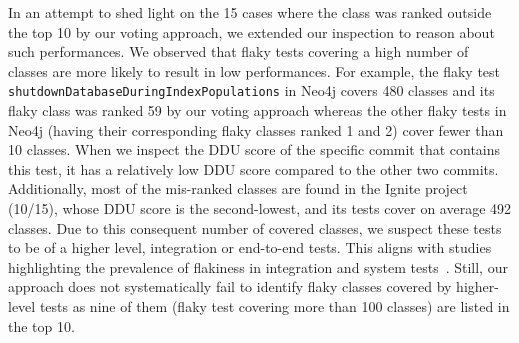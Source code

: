 \begin{table*}[ht]
\caption{DDU metrics for the analysed test suites. \label{tab:DDU}}
\centering
{}
\end{table*}


In an attempt to shed light on the 15 cases where the class was ranked outside the top 10 by our voting approach, we extended our inspection to reason about such performances. We observed that flaky tests covering a high number of classes are more likely to result in low performances. 
For example, the flaky test \texttt{shutdownDatabaseDuringIndexPopulations} in Neo4j covers 480 classes and its flaky class was ranked 59 by our voting approach whereas the other flaky tests in Neo4j (having their corresponding flaky classes ranked 1 and 2) cover fewer than 10 classes. When we inspect the DDU score of the specific commit that contains this test, it has a relatively low DDU score compared to the other two commits. 
Additionally, most of the mis-ranked classes are found in the Ignite project (10/15), whose DDU score is the second-lowest, and its tests cover on average 492 classes. Due to this consequent number of covered classes, we suspect these tests to be of a higher level, \ie integration or end-to-end tests. 
This aligns with studies highlighting the prevalence of flakiness in integration and system tests~\cite{Kowalczyk2020,Herzig2015}.
Still, our approach does not systematically fail to identify flaky classes covered by higher-level tests as nine of them (flaky test covering more than 100 classes) are listed in the top 10.